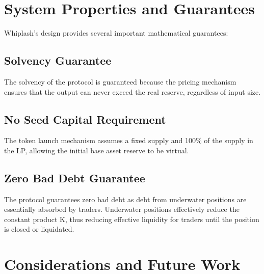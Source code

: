 \documentclass[11pt]{article}
\begin{document}
\section{System Properties and Guarantees}

Whiplash's design provides several important mathematical guarantees:

\subsection{Solvency Guarantee}

The solvency of the protocol is guaranteed because the pricing mechanism ensures that the output can never exceed the real reserve, regardless of input size.

\subsection{No Seed Capital Requirement}

The token launch mechanism assumes a fixed supply and 100\% of the supply in the LP, allowing the initial base asset reserve to be virtual.

\subsection{Zero Bad Debt Guarantee}

The protocol guarantees zero bad debt as debt from underwater positions are essentially absorbed by traders. Underwater positions effectively reduce the constant product K, thus reducing effective liquidity for traders until the position is closed or liquidated.

\section{Considerations and Future Work}
\end{document}
